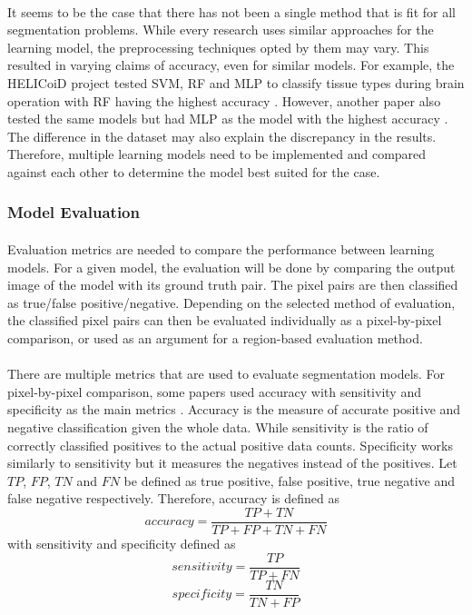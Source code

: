 \documentclass[12pt]{article}
\begin{document}
    \paragraph{}
    It seems to be the case that there has not been a single method that is fit for all segmentation problems. While every research uses similar approaches for the learning model, the preprocessing techniques opted by them may vary. This resulted in varying claims of accuracy, even for similar models. For example, the HELICoiD project tested SVM, RF and MLP to classify tissue types during brain operation with RF having the highest accuracy \cite{fabelo_helicoid_2016}. However, another paper also tested the same models but had MLP as the model with the highest accuracy \cite{giannantonio_intra-operative_2023}. The difference in the dataset may also explain the discrepancy in the results. Therefore, multiple learning models need to be implemented and compared against each other to determine the model best suited for the case.
    

    \subsubsection*{Model Evaluation}
    \paragraph{}
    Evaluation metrics are needed to compare the performance between learning models. For a given model, the evaluation will be done by comparing the output image of the model with its ground truth pair. The pixel pairs are then classified as true/false positive/negative. Depending on the selected method of evaluation, the classified pixel pairs can then be evaluated individually as a pixel-by-pixel comparison, or used as an argument for a region-based evaluation method.
    
    \paragraph{}
    There are multiple metrics that are used to evaluate segmentation models. For pixel-by-pixel comparison, some papers used accuracy with sensitivity and specificity as the main metrics \cite{fabelo_helicoid_2016, manni_hyperspectral_2020}. Accuracy is the measure of accurate positive and negative classification given the whole data. While sensitivity is the ratio of correctly classified positives to the actual positive data counts. Specificity works similarly to sensitivity but it measures the negatives instead of the positives. Let \(TP\), \(FP\), \(TN\) and \(FN\) be defined as true positive, false positive, true negative and false negative respectively. Therefore, accuracy is defined as 
    \[accuracy = \frac{TP+TN}{TP+FP+TN+FN}\]
    with sensitivity and specificity defined as
    \[sensitivity = \frac{TP}{TP+FN}\]
    \[specificity = \frac{TN}{TN+FP}\]
    
\end{document}
